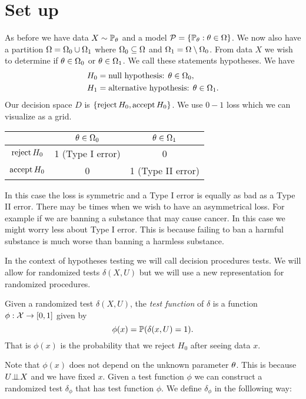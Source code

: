 \section{Set up}
As before we have data $X \sim {\mathbb{P}}_{\theta}$ and a model ${\mathcal{P}} = \{{\mathbb{P}}_{\theta} : {\theta} \in {{\Omega}} \}$. We now also have a partition ${{\Omega}} = {{\Omega}}_0 \cup {{\Omega}}_1$ where ${{\Omega}}_0 \subseteq {{\Omega}}$ and ${{\Omega}}_1 = {{\Omega}} \setminus {{\Omega}}_0$. From data $X$ we wish to determine if ${\theta} \in {{\Omega}}_0$ or ${\theta} \in {{\Omega}}_1$. We call these statements hypotheses. We have 
\begin{align*}
    H_0 &= \text{null hypothesis: } {\theta} \in {{\Omega}}_0,\\
    H_1 &= \text{alternative hypothesis: } {\theta} \in {{\Omega}}_1.
\end{align*}
Our decision space $D$ is $\{\operatorname{reject} H_0, \operatorname*{accept} H_0\}$. We use $0-1$ loss which we can visualize as a grid. 
\begin{center}
    \begin{tabular}{|c|c|c|}
        \hline
        &${\theta} \in {{\Omega}}_0$&${\theta} \in {{\Omega}}_1$\\
        \hline 
        $\operatorname{reject} H_0$&1 (Type I error)&0\\
        \hline
        $\operatorname*{accept} H_0$&0&1 (Type II error)\\
        \hline        
    \end{tabular}
\end{center}
\begin{remark}
    In this case the loss is symmetric and a Type I error is equally as bad as a Type II error. There may be times when we wish to have an asymmetrical loss. For example if we are banning a substance that may cause cancer. In this case we might worry less about Type I error. This is because failing to ban a harmful substance is much worse than banning a harmless substance.
\end{remark}
In the context of hypotheses testing we will call decision procedures tests. We will allow for randomized tests $\delta(X,U)$ but we will use a new representation for randomized procedures.
\begin{defn}
    Given a randomized test $\delta(X,U)$, the \emph{test function} of $\delta$ is a function $\phi : {\mathcal{X}} \to [0,1]$ given by 
    \[\phi(x) = {\mathbb{P}}(\delta(x,U)=1). \]
    That is $\phi(x)$ is the probability that we reject $H_0$ after seeing data $x$. 
\end{defn}
Note that $\phi(x)$ does not depend on the unknown parameter ${\theta}$. This is because $U {\perp\!\!\!\perp} X$ and we have fixed $x$. Given a test function $\phi$ we can construct a randomized test $\delta_\phi$ that has test function $\phi$. We define $\delta_\phi$ in the folllowing way:

